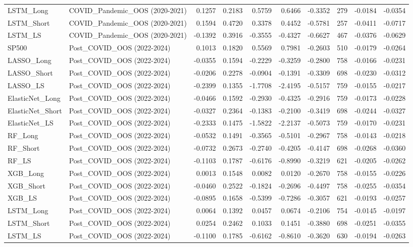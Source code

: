 \begin{tabular}{llrrrrrrrr}
\cline{1-10}
LSTM\_Long & COVID\_Pandemic\_OOS (2020-2021) & 0.1257 & 0.2183 & 0.5759 & 0.6466 & -0.3352 & 279 & -0.0184 & -0.0354 \\
\cline{1-10}
LSTM\_Short & COVID\_Pandemic\_OOS (2020-2021) & 0.1594 & 0.4720 & 0.3378 & 0.4452 & -0.5781 & 257 & -0.0411 & -0.0717 \\
\cline{1-10}
LSTM\_LS & COVID\_Pandemic\_OOS (2020-2021) & -0.1392 & 0.3916 & -0.3555 & -0.4327 & -0.6627 & 467 & -0.0376 & -0.0629 \\
\cline{1-10}
SP500 & Post\_COVID\_OOS (2022-2024) & 0.1013 & 0.1820 & 0.5569 & 0.7981 & -0.2603 & 510 & -0.0179 & -0.0264 \\
\cline{1-10}
LASSO\_Long & Post\_COVID\_OOS (2022-2024) & -0.0355 & 0.1594 & -0.2229 & -0.3259 & -0.2800 & 758 & -0.0166 & -0.0231 \\
\cline{1-10}
LASSO\_Short & Post\_COVID\_OOS (2022-2024) & -0.0206 & 0.2278 & -0.0904 & -0.1391 & -0.3309 & 698 & -0.0230 & -0.0312 \\
\cline{1-10}
LASSO\_LS & Post\_COVID\_OOS (2022-2024) & -0.2399 & 0.1355 & -1.7708 & -2.4195 & -0.5157 & 759 & -0.0155 & -0.0217 \\
\cline{1-10}
ElasticNet\_Long & Post\_COVID\_OOS (2022-2024) & -0.0466 & 0.1592 & -0.2930 & -0.4325 & -0.2916 & 759 & -0.0173 & -0.0228 \\
\cline{1-10}
ElasticNet\_Short & Post\_COVID\_OOS (2022-2024) & -0.0327 & 0.2364 & -0.1383 & -0.2100 & -0.3419 & 698 & -0.0244 & -0.0327 \\
\cline{1-10}
ElasticNet\_LS & Post\_COVID\_OOS (2022-2024) & -0.2333 & 0.1475 & -1.5822 & -2.2137 & -0.5073 & 759 & -0.0170 & -0.0231 \\
\cline{1-10}
RF\_Long & Post\_COVID\_OOS (2022-2024) & -0.0532 & 0.1491 & -0.3565 & -0.5101 & -0.2967 & 758 & -0.0143 & -0.0218 \\
\cline{1-10}
RF\_Short & Post\_COVID\_OOS (2022-2024) & -0.0732 & 0.2673 & -0.2740 & -0.4205 & -0.4147 & 698 & -0.0268 & -0.0360 \\
\cline{1-10}
RF\_LS & Post\_COVID\_OOS (2022-2024) & -0.1103 & 0.1787 & -0.6176 & -0.8990 & -0.3219 & 621 & -0.0205 & -0.0262 \\
\cline{1-10}
XGB\_Long & Post\_COVID\_OOS (2022-2024) & 0.0013 & 0.1548 & 0.0082 & 0.0120 & -0.2670 & 758 & -0.0155 & -0.0226 \\
\cline{1-10}
XGB\_Short & Post\_COVID\_OOS (2022-2024) & -0.0460 & 0.2522 & -0.1824 & -0.2696 & -0.4497 & 758 & -0.0255 & -0.0354 \\
\cline{1-10}
XGB\_LS & Post\_COVID\_OOS (2022-2024) & -0.0895 & 0.1658 & -0.5399 & -0.7286 & -0.3057 & 621 & -0.0193 & -0.0257 \\
\cline{1-10}
LSTM\_Long & Post\_COVID\_OOS (2022-2024) & 0.0064 & 0.1392 & 0.0457 & 0.0674 & -0.2106 & 754 & -0.0145 & -0.0197 \\
\cline{1-10}
LSTM\_Short & Post\_COVID\_OOS (2022-2024) & 0.0254 & 0.2462 & 0.1033 & 0.1451 & -0.3880 & 698 & -0.0251 & -0.0355 \\
\cline{1-10}
LSTM\_LS & Post\_COVID\_OOS (2022-2024) & -0.1100 & 0.1785 & -0.6162 & -0.8610 & -0.3620 & 630 & -0.0194 & -0.0263 \\
\cline{1-10}
\bottomrule
\end{tabular}

